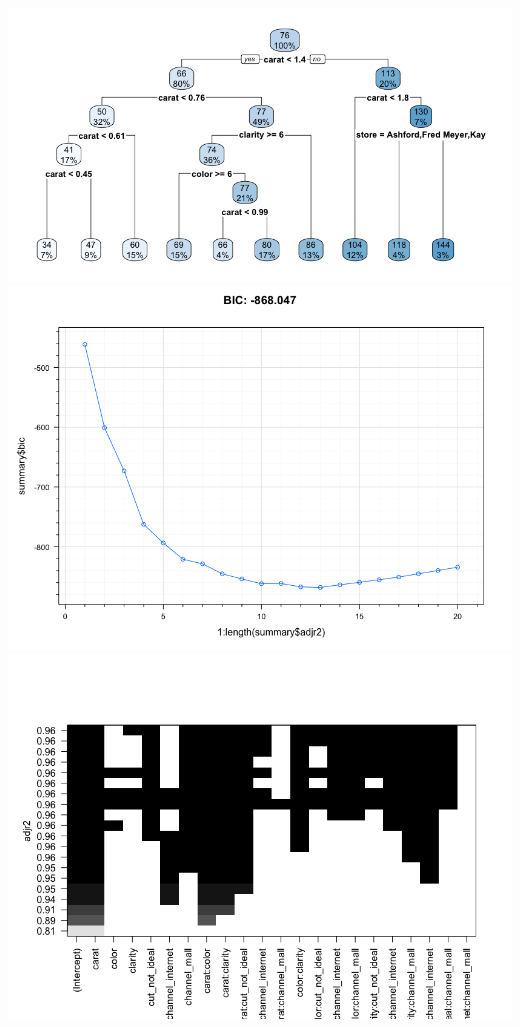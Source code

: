 \documentclass[floatsintext,man]{apa6}
\theoremstyle{definition}
\theoremstyle{definition}
\theoremstyle{definition}
\theoremstyle{remark}
\begin{document}
\includegraphics{../reports/rpart_tree_1way.png}
\includegraphics{../reports/bsr_bic_xy.png}
\includegraphics{../reports/bsr_lvl_r2.png}
\end{document}
